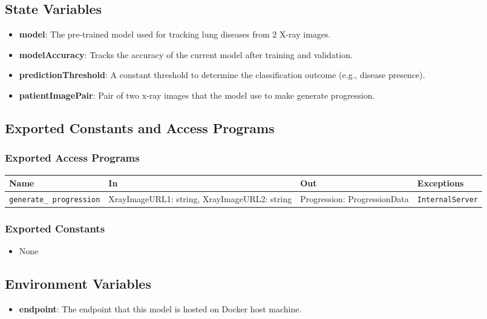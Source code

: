 \documentclass[12pt, titlepage]{article}
\begin{document}
\subsection{State Variables}
\begin{itemize}
    \item \textbf{model}: The pre-trained model used for tracking lung diseases from 2 X-ray images.
    \item \textbf{modelAccuracy}: Tracks the accuracy of the current model after training and validation.
    \item \textbf{predictionThreshold}: A constant threshold to determine the classification outcome (e.g., disease presence).
    \item \textbf{patientImagePair}: Pair of two x-ray images that the model use to make generate progression.
\end{itemize}

\subsection{Exported Constants and Access Programs}
\subsubsection{Exported Access Programs}
\begin{center}
\small
\renewcommand{\arraystretch}{1.5}
\begin{tabular}{|p{3.5cm}|p{3.5cm}|p{2.5cm}|p{3.5cm}|}
    \hline
    \textbf{Name} & \textbf{In} & \textbf{Out} & \textbf{Exceptions} \\
    \hline 
    \texttt{generate\_ progression} & XrayImageURL1: string, \newline XrayImageURL2: string & Progression: ProgressionData & \texttt{InternalServer} \\
    \hline
\end{tabular}
\end{center}

\subsubsection{Exported Constants}
\begin{itemize}
    \item None
\end{itemize}

\subsection{Environment Variables}
\begin{itemize}
    \item \textbf{endpoint}: The endpoint that this model is hosted on Docker host machine.
\end{itemize}
\end{document}
